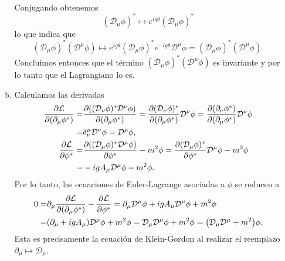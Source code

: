 \documentclass{article}
\begin{document}
\begin{enumerate}[1)]
\begin{enumerate}[a)]
\begin{align}
\end{align}
Conjugando obtenemos
\begin{equation}
(\mathcal{D}_\mu\phi)^*\mapsto e^{ig\theta}(\mathcal{D}_\mu\phi)^*
\end{equation}
lo que indica que
\begin{equation}
(\mathcal{D}_\mu\phi)^*(\mathcal{D}^\mu\phi)\mapsto e^{ig\theta}(\mathcal{D}_\mu\phi)^*e^{-ig\theta}\mathcal{D}^\mu\phi=(\mathcal{D}_\mu\phi)^*(\mathcal{D}^\mu\phi).
\end{equation}
Concluimos entonces que el término $(\mathcal{D}_\mu\phi)^*(\mathcal{D}^\mu\phi)$ es invariante y por lo tanto que el Lagrangiano lo es.

\item Calculamos las derivadas
\begin{align}
\begin{split}
\pdv{\mathcal{L}}{(\partial_\mu\phi^*)}=&\pdv{((\mathcal{D}_\nu\phi)^*\mathcal{D}^\nu\phi)}{(\partial_\mu\phi^*)}=\pdv{(\mathcal{D}_\nu\phi)^*}{(\partial_\mu\phi^*)}\mathcal{D}^\nu\phi=\pdv{(\partial_\nu\phi^*)}{(\partial_\mu\phi^*)}\mathcal{D}^\nu\phi\\
=&\delta_\nu^\mu\mathcal{D}^\nu\phi=\mathcal{D}^\mu\phi,\\
\pdv{\mathcal{L}}{\phi^*}=&\pdv{((\mathcal{D}_\mu\phi)^*\mathcal{D}^\mu\phi)}{\phi^*}-m^2\phi=\pdv{(\mathcal{D}_\mu\phi)^*}{\phi^*}\mathcal{D}^\mu\phi-m^2\phi\\
=&-igA_\mu\mathcal{D}^\mu\phi-m^2\phi.
\end{split}
\end{align}
Por lo tanto, las ecuaciones de Euler-Lagrange asociadas a $\phi$ se reducen a 
\begin{align}
\begin{split}
0=&\partial_\mu\pdv{\mathcal{L}}{(\partial_\mu\phi^*)}-\pdv{\mathcal{L}}{\phi^*}=\partial_\mu\mathcal{D}^\mu\phi+igA_\mu\mathcal{D}^\mu\phi+m^2\phi\\
=&(\partial_\mu+igA_\mu)\mathcal{D}^\mu\phi+m^2\phi=\mathcal{D}_\mu\mathcal{D}^\mu\phi+m^2\phi=\qty(\mathcal{D}_\mu\mathcal{D}^\mu+m^2)\phi.
\end{split}
\end{align}
Esta es precisamente la ecuación de Klein-Gordon al realizar el reemplazo $\partial_\mu\mapsto\mathcal{D}_\mu$.

\end{enumerate}


\end{enumerate}
\end{document}
